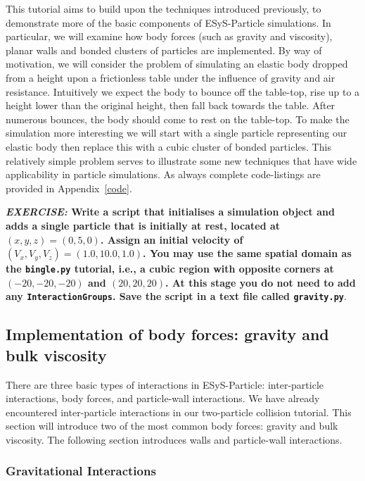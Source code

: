 This tutorial aims to build upon the techniques introduced previously, to demonstrate more of the basic components of ESyS-Particle simulations. In particular, we will examine how body forces (such as gravity and viscosity), planar walls and bonded clusters of particles are implemented. By way of motivation, we will consider the problem of simulating an elastic body dropped from a height upon a frictionless table under the influence of gravity and air resistance. Intuitively we expect the body to bounce off the table-top, rise up to a height lower than the original height, then fall back towards the table. After numerous bounces, the body should come to rest on the table-top. To make the simulation more interesting we will start with a single particle representing our elastic body then replace this with a cubic cluster of bonded particles. This relatively simple problem serves to illustrate some new techniques that have wide applicability in particle simulations. As always complete code-listings are provided 
in Appendix~\ref{code}.

\vskip 5mm
\noindent \textbf{\emph{EXERCISE:} Write a script that initialises a simulation object and adds a single particle that is initially at rest, located at $(x,y,z) = (0,5,0)$. Assign an initial velocity of $(V_x, V_y, V_z) = (1.0, 10.0, 1.0)$. You may use the same spatial domain as the \texttt{bingle.py} tutorial, i.e., a cubic region with opposite corners at $(-20,-20,-20)$ and $(20,20,20)$. At this stage you do not need to add any \texttt{InteractionGroups}. Save the script in a text file called \texttt{gravity.py}}.
\vskip 5mm

\subsection{Implementation of body forces: gravity and bulk viscosity}

There are three basic types of interactions in ESyS-Particle: inter-particle interactions, body forces, and particle-wall interactions. We have already encountered inter-particle interactions in our two-particle collision tutorial. This section will introduce two of the most common body forces: gravity and bulk viscosity. The following section introduces walls and particle-wall interactions.

\subsubsection{Gravitational Interactions}

